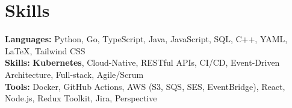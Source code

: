 \documentclass[11pt]{article}       %
\begin{document}
\vspace{-18.5pt}


\section*{Skills}
\textbf{Languages:} Python, Go, TypeScript, Java, JavaScript, SQL, C++, YAML, LaTeX, Tailwind CSS\\
\textbf{Skills:} \textbf{Kubernetes}, Cloud-Native, RESTful APIs, CI/CD, Event-Driven Architecture, Full-stack, Agile/Scrum\\
\textbf{Tools:} Docker, GitHub Actions, AWS (S3, SQS, SES, EventBridge), React, Node.js, Redux Toolkit, Jira, Perspective\\

\vspace{-6.5pt}
\end{document}
